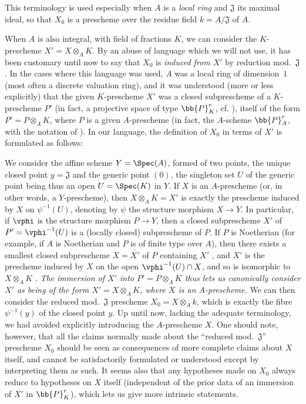 \begin{env}[3.7.2]
\label{I.3.7.2}
This terminology is used especially when $A$ is a \emph{local ring} and $\mathfrak{J}$ its maximal ideal, so that $X_0$ is a prescheme over the residue field $k=A/\mathfrak{J}$ of $A$.

When $A$ is also integral, with field of fractions $K$, we can consider the $K$-prescheme $X'=X\otimes_A K$.
By an abuse of language which we will not use, it has been customary until now to say that $X_0$ is \emph{induced from $X'$} by reduction mod.~$\mathfrak{J}$.
In the cases where this language was used, $A$ was a local ring of dimension~$1$ (most often a discrete valuation ring), and it was understood (more or less explicitly) that the given $K$-prescheme $X'$ was a closed subprescheme of a $K$-prescheme $P'$ (in fact, a projective space of type $\bb{P}_K^r$, cf. ), itself of the form $P'=P\otimes_A K$, where $P$ is a given $A$-prescheme (in fact, the $A$-scheme $\bb{P}_A^r$, with the notation of ).
In our language, the definition of $X_0$ in terms of $X'$ is formulated as follows:

We consider the affine scheme $Y=\Spec(A)$, formed of two points, the unique closed point
$y=\mathfrak{J}$ and the generic point $(0)$, the singleton set $U$ of the generic point being thus an open $U=\Spec(K)$ in $Y$.
If $X$ is an $A$-prescheme (or, in other words, a $Y$-prescheme), then $X\otimes_A K=X'$ is exactly the prescheme induced by $X$ on $\psi^{-1}(U)$, denoting by $\psi$ the structure morphism $X\to Y$.
In particular, if $\vphi$ is the structure morphism $P\to Y$, then a closed subprescheme $X'$ of $P'=\vphi^{-1}(U)$ is a (locally closed) subprescheme of $P$.
If $P$ is Noetherian (for example, if $A$ is Noetherian and $P$ is of finite type over $A$), then there exists a smallest closed subprescheme $X=\overline{X'}$ of $P$ containing $X'$ , and $X'$ is the prescheme induced by $X$ on the open $\vphi^{-1}(U)\cap X$, and so is isomorphic to $X\otimes_A K$ .
\emph{The immersion of $X'$ into $P'=P\otimes_A K$ thus lets us canonically consider $X'$ as being of the form $X'=X\otimes_A K$, where $X$ is an $A$-prescheme.}
We can then consider the reduced mod.~$\mathfrak{J}$ prescheme $X_0=X\otimes_A k$, which is exactly the fibre $\psi^{-1}(y)$ of the closed point $y$.
Up until now, lacking the adequate terminology, we had avoided explicitly introducing the $A$-prescheme $X$.
One should note, however, that all the claims normally made about the ``reduced mod.~$\mathfrak{J}$'' prescheme $X_0$ should be seen as consequences of more complete claims about $X$ itself, and cannot be satisfactorily formulated or understood except by interpreting them as such.
It seems also that any hypotheses made on $X_0$ always reduce to hypotheses on $X$ itself (independent of the prior data of an immersion of $X'$ in $\bb{P}_K^r$), which lets us give more intrinsic statements.
\end{env}

